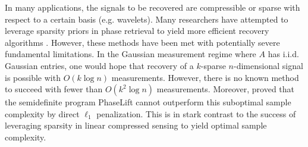 \documentclass{article}
\begin{document}
In many applications, the signals to be recovered are compressible or sparse with respect to a certain basis (e.g. wavelets). Many researchers have attempted to leverage sparsity priors in phase retrieval to yield more efficient recovery algorithms 
\cite{Cai2016, Voroninski2013, SPARTA, Jain2013,SparsePRoverview,Hedge2017}. However, these methods have been met with potentially severe fundamental limitations. In the Gaussian measurement regime where $A$ has i.i.d. Gaussian entries, one would hope that recovery of a $k$-sparse $n$-dimensional signal is possible with $O(k\log n)$ measurements. However, there is no known method to succeed with fewer than $O(k^2 \log n)$ measurements. Moreover, \cite{Voroninski2013} proved that the semidefinite program PhaseLift cannot outperform this suboptimal sample complexity by direct $\ell_1$ penalization. This is in stark contrast to the success of leveraging sparsity in linear compressed sensing to yield optimal sample complexity. %
\end{document}
